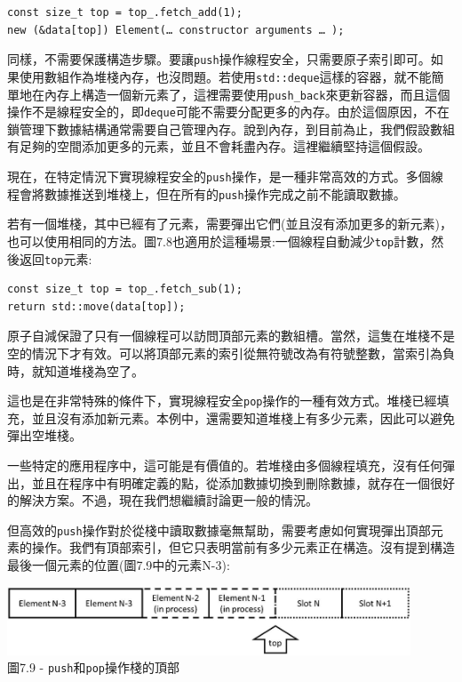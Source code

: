 \begin{lstlisting}[style=styleCXX]
const size_t top = top_.fetch_add(1);
new (&data[top]) Element(… constructor arguments … );
\end{lstlisting}

同樣，不需要保護構造步驟。要讓\texttt{push}操作線程安全，只需要原子索引即可。如果使用數組作為堆棧內存，也沒問題。若使用\texttt{std::deque}這樣的容器，就不能簡單地在內存上構造一個新元素了，這裡需要使用\texttt{push\_back}來更新容器，而且這個操作不是線程安全的，即\texttt{deque}可能不需要分配更多的內存。由於這個原因，不在鎖管理下數據結構通常需要自己管理內存。說到內存，到目前為止，我們假設數組有足夠的空間添加更多的元素，並且不會耗盡內存。這裡繼續堅持這個假設。

現在，在特定情況下實現線程安全的\texttt{push}操作，是一種非常高效的方式。多個線程會將數據推送到堆棧上，但在所有的\texttt{push}操作完成之前不能讀取數據。

若有一個堆棧，其中已經有了元素，需要彈出它們(並且沒有添加更多的新元素)，也可以使用相同的方法。圖7.8也適用於這種場景:一個線程自動減少\texttt{top}計數，然後返回\texttt{top}元素:

\begin{lstlisting}[style=styleCXX]
const size_t top = top_.fetch_sub(1);
return std::move(data[top]);
\end{lstlisting}

原子自減保證了只有一個線程可以訪問頂部元素的數組槽。當然，這隻在堆棧不是空的情況下才有效。可以將頂部元素的索引從無符號改為有符號整數，當索引為負時，就知道堆棧為空了。

這也是在非常特殊的條件下，實現線程安全\texttt{pop}操作的一種有效方式。堆棧已經填充，並且沒有添加新元素。本例中，還需要知道堆棧上有多少元素，因此可以避免彈出空堆棧。

一些特定的應用程序中，這可能是有價值的。若堆棧由多個線程填充，沒有任何彈出，並且在程序中有明確定義的點，從添加數據切換到刪除數據，就存在一個很好的解決方案。不過，現在我們想繼續討論更一般的情況。

但高效的\texttt{push}操作對於從棧中讀取數據毫無幫助，需要考慮如何實現彈出頂部元素的操作。我們有頂部索引，但它只表明當前有多少元素正在構造。沒有提到構造最後一個元素的位置(圖7.9中的元素N-3):

\begin{center}
\includegraphics[width=0.9\textwidth]{content/2/chapter7/images/9.jpg}\\
圖7.9 - \texttt{push}和\texttt{pop}操作棧的頂部
\end{center}

